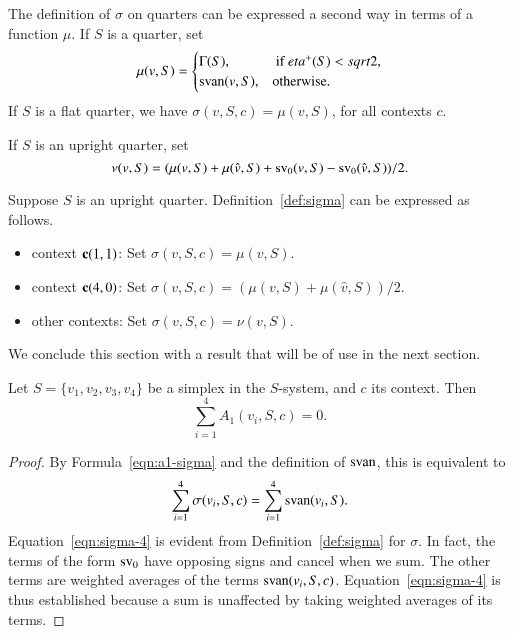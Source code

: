 The definition of $\sigma$ on quarters can be expressed a second
way in terms of a function $\mu$.  If $S$ is a quarter, set
    \begin{equation}
    \mu(v,S)=\begin{cases}
    \Gamma(S),&  \text{ if }eta^+(S)<sqrt2,\\
    {\operatorname{svan}}(v,S),& \hbox{otherwise.}\end{cases}
    \label{eqn:3.8}
    \end{equation}
If $S$ is a flat quarter, we have $\sigma(v,S,c)=\mu(v,S)$, for
all contexts $c$.

\begin{definition}[$\nu$] If $S$ is an upright quarter, set
$$\nu(v,S)=(\mu(v,S)+\mu(\hat v,S) + 
  {\operatorname{sv}}_0(v,S)-{\operatorname{sv}}_0(\hat v,S))/2.$$
\end{definition}


Suppose $S$ is an upright quarter.
Definition~\ref{def:sigma} can be expressed as follows.


\begin{itemize}
 \item context ${\operatorname{\bf c}}{(1,1)}$:  Set $\sigma(v,S,c)=\mu(v,S)$.
 \item context
    ${\operatorname{\bf c}}{(4,0)}$:  Set $\sigma(v,S,c)=(\mu(v,S)+\mu(\hat v,S))/2$.
 \item other contexts:
 Set $\sigma(v,S,c)=\nu(v,S)$.
\end{itemize}





We conclude this section with a result that will be of use in the
next section.

\begin{lemma}\label{lemma:A1-cancel}
Let $S=\{v_1,v_2,v_3,v_4\}$ be a simplex in the $S$-system,  and $c$
its context.   Then
   $$\sum_{i=1}^4 A_1(v_i,S,c)=0.$$
\end{lemma}

\begin{proof}
   By Formula~\ref{eqn:a1-sigma} and the definition of ${\operatorname{svan}}$,
this is equivalent to
      \begin{equation}
      \sum_{i=1}^4 \sigma(v_i,S,c) = \sum_{i=1}^4
      {\operatorname{svan}}(v_i,S). 
      \label{eqn:sigma-4}
      \end{equation}
Equation~\ref{eqn:sigma-4} is evident from
Definition~\ref{def:sigma} for $\sigma$.  In fact, the terms of the
form ${\operatorname{sv}}_0$ have opposing signs and cancel when we sum. The other
terms are weighted averages of the terms ${\operatorname{svan}}(v_i,S,c)$.
Equation~\ref{eqn:sigma-4} is thus established because a sum is
unaffected by taking weighted averages of its terms.
\end{proof}


